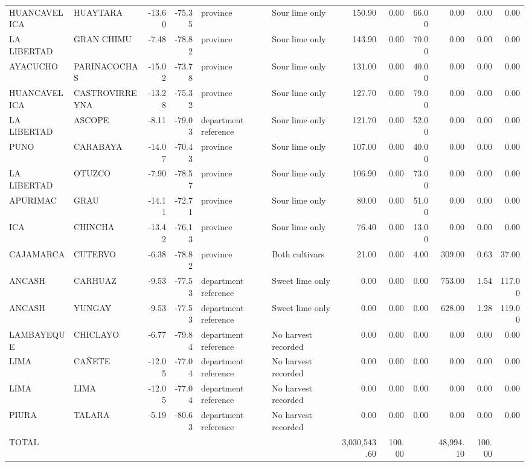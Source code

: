 \begin{longtable}{llrrllrrrrrr}
HUANCAVELICA & HUAYTARA & -13.60 & -75.35 & province & Sour lime only & 150.90 & 0.00 & 66.00 & 0.00 & 0.00 & 0.00 \\
LA LIBERTAD & GRAN CHIMU & -7.48 & -78.82 & province & Sour lime only & 143.90 & 0.00 & 70.00 & 0.00 & 0.00 & 0.00 \\
AYACUCHO & PARINACOCHAS & -15.02 & -73.78 & province & Sour lime only & 131.00 & 0.00 & 40.00 & 0.00 & 0.00 & 0.00 \\
HUANCAVELICA & CASTROVIRREYNA & -13.28 & -75.32 & province & Sour lime only & 127.70 & 0.00 & 79.00 & 0.00 & 0.00 & 0.00 \\
LA LIBERTAD & ASCOPE & -8.11 & -79.03 & department reference & Sour lime only & 121.70 & 0.00 & 52.00 & 0.00 & 0.00 & 0.00 \\
PUNO & CARABAYA & -14.07 & -70.43 & province & Sour lime only & 107.00 & 0.00 & 40.00 & 0.00 & 0.00 & 0.00 \\
LA LIBERTAD & OTUZCO & -7.90 & -78.57 & province & Sour lime only & 106.90 & 0.00 & 73.00 & 0.00 & 0.00 & 0.00 \\
APURIMAC & GRAU & -14.11 & -72.71 & province & Sour lime only & 80.00 & 0.00 & 51.00 & 0.00 & 0.00 & 0.00 \\
ICA & CHINCHA & -13.42 & -76.13 & province & Sour lime only & 76.40 & 0.00 & 13.00 & 0.00 & 0.00 & 0.00 \\
CAJAMARCA & CUTERVO & -6.38 & -78.82 & province & Both cultivars & 21.00 & 0.00 & 4.00 & 309.00 & 0.63 & 37.00 \\
ANCASH & CARHUAZ & -9.53 & -77.53 & department reference & Sweet lime only & 0.00 & 0.00 & 0.00 & 753.00 & 1.54 & 117.00 \\
ANCASH & YUNGAY & -9.53 & -77.53 & department reference & Sweet lime only & 0.00 & 0.00 & 0.00 & 628.00 & 1.28 & 119.00 \\
LAMBAYEQUE & CHICLAYO & -6.77 & -79.84 & department reference & No harvest recorded & 0.00 & 0.00 & 0.00 & 0.00 & 0.00 & 0.00 \\
LIMA & CAÑETE & -12.05 & -77.04 & department reference & No harvest recorded & 0.00 & 0.00 & 0.00 & 0.00 & 0.00 & 0.00 \\
LIMA & LIMA & -12.05 & -77.04 & department reference & No harvest recorded & 0.00 & 0.00 & 0.00 & 0.00 & 0.00 & 0.00 \\
PIURA & TALARA & -5.19 & -80.63 & department reference & No harvest recorded & 0.00 & 0.00 & 0.00 & 0.00 & 0.00 & 0.00 \\
TOTAL &  &  &  &  &  & 3,030,543.60 & 100.00 &  & 48,994.10 & 100.00 &  \\
\end{longtable}
